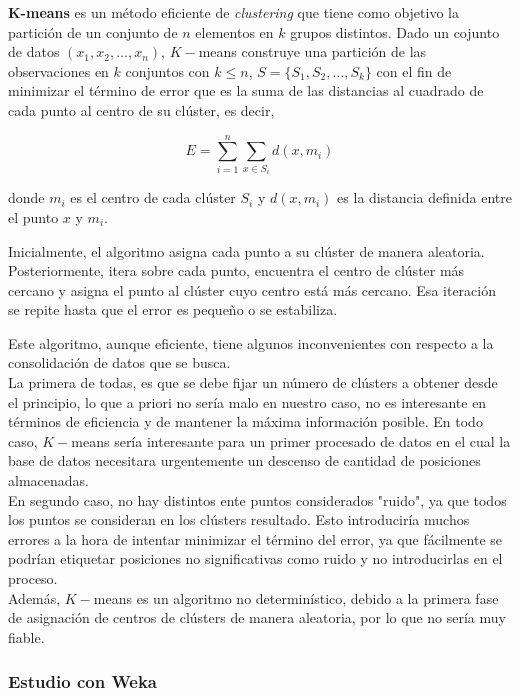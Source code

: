 \documentclass[a4paper, 12pt]{article}
\begin{document}
\textbf{K-means} es un m\'etodo eficiente de \textit{clustering} que tiene como objetivo la partici\'on de un conjunto de $n$ elementos en $k$ grupos distintos. Dado un cojunto de datos $(x_1, x_2, \ldots , x_n)$, $K-$means construye una partici\'on de las observaciones en $k$ conjuntos con $k\leq n$, $S=\{S_1, S_2, \ldots, S_k\}$ con el fin de minimizar el t\'ermino de error que es la suma de las distancias al cuadrado de cada punto al centro de su cl\'uster, es decir,

$$ E=\sum_{i=1}^{n} \sum_{x\in S_i} d(x, m_i) $$

donde $m_i$ es el centro de cada cl\'uster $S_i$ y $d(x, m_i)$ es la distancia definida entre el punto $x$ y $m_i$.

Inicialmente, el algoritmo asigna cada punto a su cl\'uster de manera aleatoria. Posteriormente, itera sobre cada punto, encuentra el centro de cl\'uster m\'as cercano y asigna el punto al cl\'uster cuyo centro est\'a m\'as cercano. Esa iteraci\'on se repite hasta que el error es peque\~no o se estabiliza.

Este algoritmo, aunque eficiente, tiene algunos inconvenientes con respecto a la consolidaci\'on de datos que se busca.
\\

La primera de todas, es que se debe fijar un n\'umero de cl\'usters a obtener desde el principio, lo que a priori no ser\'ia malo en nuestro caso, no es interesante en t\'erminos de eficiencia y de mantener la m\'axima informaci\'on posible. En todo caso, $K-$means ser\'ia interesante para un primer procesado de datos en el cual la base de datos necesitara urgentemente un descenso de cantidad de posiciones almacenadas. \\

En segundo caso, no hay distintos ente puntos considerados "ruido", ya que todos los puntos se consideran en los cl\'usters resultado. Esto introducir\'ia muchos errores a la hora de intentar minimizar el t\'ermino del error, ya que f\'acilmente se podr\'ian etiquetar posiciones no significativas como ruido y no introducirlas en el proceso.\\

Adem\'as, $K-$means es un algoritmo no determin\'istico, debido a la primera fase de asignaci\'on de centros de cl\'usters de manera aleatoria, por lo que no ser\'ia muy fiable.

\subsubsection{Estudio con Weka}
\end{document}
